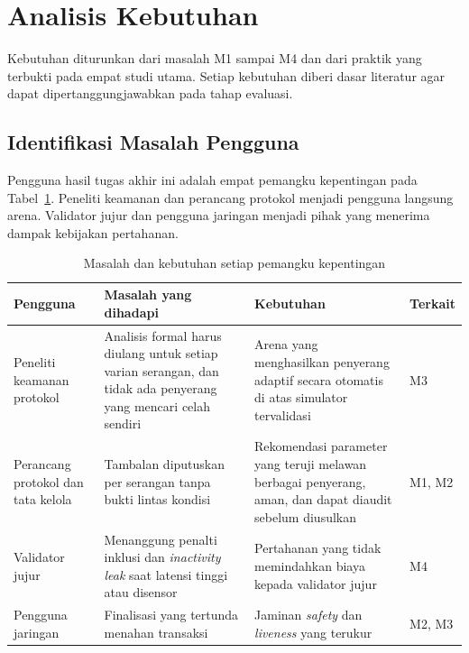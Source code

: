 \section{Analisis Kebutuhan}
\label{sec:analisis_kebutuhan}
Kebutuhan diturunkan dari masalah M1 sampai M4 dan dari praktik yang terbukti pada empat studi utama. Setiap kebutuhan diberi dasar literatur agar dapat dipertanggungjawabkan pada tahap evaluasi.

\subsection{Identifikasi Masalah Pengguna}
\label{subsec:masalah_pengguna}
Pengguna hasil tugas akhir ini adalah empat pemangku kepentingan pada Tabel~\ref{tab:pengguna}. Peneliti keamanan dan perancang protokol menjadi pengguna langsung arena. Validator jujur dan pengguna jaringan menjadi pihak yang menerima dampak kebijakan pertahanan.

\begin{table}[htbp]
\centering
\caption{Masalah dan kebutuhan setiap pemangku kepentingan}
\label{tab:pengguna}
\small
\begin{tabular}{|p{2.2cm}|p{4.6cm}|p{4.2cm}|p{1.2cm}|}
\hline
\textbf{Pengguna} & \textbf{Masalah yang dihadapi} & \textbf{Kebutuhan} & \textbf{Terkait} \\
\hline
Peneliti keamanan protokol & Analisis formal harus diulang untuk setiap varian serangan, dan tidak ada penyerang yang mencari celah sendiri \parencite{laneve2025stochastic} & Arena yang menghasilkan penyerang adaptif secara otomatis di atas simulator tervalidasi & M3 \\
\hline
Perancang protokol dan tata kelola & Tambalan diputuskan per serangan tanpa bukti lintas kondisi \parencite{laneve2025stochastic} & Rekomendasi parameter yang teruji melawan berbagai penyerang, aman, dan dapat diaudit sebelum diusulkan \parencite{skowronski2026adaptive} & M1, M2 \\
\hline
Validator jujur & Menanggung penalti inklusi dan \textit{inactivity leak} saat latensi tinggi atau disensor \parencite{laneve2025stochastic} & Pertahanan yang tidak memindahkan biaya kepada validator jujur & M4 \\
\hline
Pengguna jaringan & Finalisasi yang tertunda menahan transaksi \parencite{laneve2025stochastic} & Jaminan \textit{safety} dan \textit{liveness} yang terukur & M2, M3 \\
\hline
\end{tabular}
\end{table}

